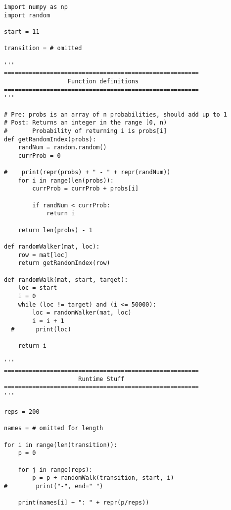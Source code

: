\documentclass[letterpaper,12pt]{article}
\begin{document}
\begin{verbatim}
import numpy as np
import random

start = 11

transition = # omitted

'''
=======================================================
                  Function definitions
=======================================================
'''

# Pre: probs is an array of n probabilities, should add up to 1
# Post: Returns an integer in the range [0, n)
#       Probability of returning i is probs[i]
def getRandomIndex(probs):    
    randNum = random.random()
    currProb = 0
    
#    print(repr(probs) + " - " + repr(randNum))
    for i in range(len(probs)):
        currProb = currProb + probs[i]
        
        if randNum < currProb:
            return i

    return len(probs) - 1

def randomWalker(mat, loc):
    row = mat[loc]
    return getRandomIndex(row)

def randomWalk(mat, start, target):
    loc = start
    i = 0
    while (loc != target) and (i <= 50000):
        loc = randomWalker(mat, loc)
        i = i + 1
  #      print(loc)

    return i

'''
=======================================================
                     Runtime Stuff
=======================================================
'''

reps = 200

names = # omitted for length

for i in range(len(transition)):
    p = 0
    
    for j in range(reps):
        p = p + randomWalk(transition, start, i)
#        print("-", end=" ")

    print(names[i] + ": " + repr(p/reps))
\end{verbatim}
\end{document}
